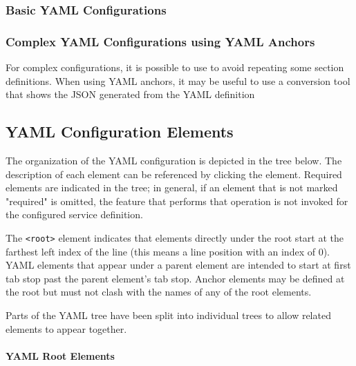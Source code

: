 \subsubsection{Basic YAML Configurations}



\newpage


\subsubsection{Complex YAML Configurations using YAML Anchors}

For complex configurations, it is possible to use 
to avoid repeating some section definitions.  When using YAML anchors, it may be useful
to use a  conversion tool that shows the JSON generated from the YAML
definition



\subsection{YAML Configuration Elements}\label{sec:yaml-config}

The organization of the YAML configuration is depicted in the tree below.  The description of each element
can be referenced by clicking the element.  Required elements are indicated in the tree; in general, if an
element that is not marked "required" is omitted, the feature that performs that operation is not invoked
for the configured service definition.

The \texttt{<root>} element indicates that elements directly under the root start at the farthest
left index of the line (this means a line position with an index of 0).  YAML elements that appear
under a parent element are intended to start at first tab stop past the parent element's tab stop.
Anchor elements may be defined at the root but must not clash with the names of any of the root elements.

Parts of the YAML tree have been split into individual trees to allow related elements to appear together.

\paragraph{YAML Root Elements}\label{sec:yaml-root}

